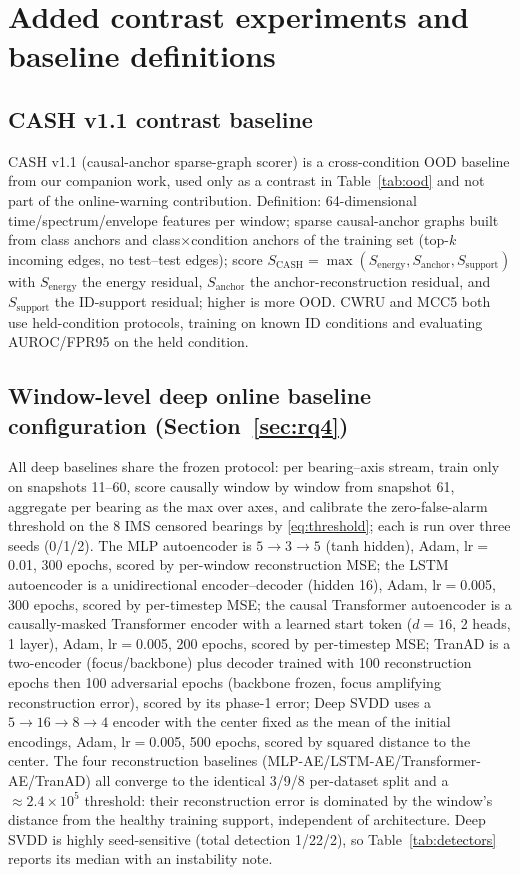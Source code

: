 \documentclass[journal]{IEEEtran}
\begin{document}
\section{Added contrast experiments and baseline definitions}\label{app:baselines}
\subsection*{CASH v1.1 contrast baseline}
CASH v1.1 (causal-anchor sparse-graph scorer) is a cross-condition OOD baseline from our companion work, used only as a contrast in Table~\ref{tab:ood} and not part of the online-warning contribution. Definition: 64-dimensional time/spectrum/envelope features per window; sparse causal-anchor graphs built from class anchors and class$\times$condition anchors of the training set (top-$k$ incoming edges, no test--test edges); score $S_{\mathrm{CASH}}=\max(S_{\mathrm{energy}},S_{\mathrm{anchor}},S_{\mathrm{support}})$ with $S_{\mathrm{energy}}$ the energy residual, $S_{\mathrm{anchor}}$ the anchor-reconstruction residual, and $S_{\mathrm{support}}$ the ID-support residual; higher is more OOD. CWRU and MCC5 both use held-condition protocols, training on known ID conditions and evaluating AUROC/FPR95 on the held condition.

\subsection*{Window-level deep online baseline configuration (Section~\ref{sec:rq4})}
All deep baselines share the frozen protocol: per bearing--axis stream, train only on snapshots 11--60, score causally window by window from snapshot 61, aggregate per bearing as the max over axes, and calibrate the zero-false-alarm threshold on the 8 IMS censored bearings by \eqref{eq:threshold}; each is run over three seeds (0/1/2). The MLP autoencoder is $5\to3\to5$ (tanh hidden), Adam, lr$=$0.01, 300 epochs, scored by per-window reconstruction MSE; the LSTM autoencoder is a unidirectional encoder--decoder (hidden 16), Adam, lr$=$0.005, 300 epochs, scored by per-timestep MSE; the causal Transformer autoencoder is a causally-masked Transformer encoder with a learned start token ($d{=}16$, 2 heads, 1 layer), Adam, lr$=$0.005, 200 epochs, scored by per-timestep MSE; TranAD is a two-encoder (focus/backbone) plus decoder trained with 100 reconstruction epochs then 100 adversarial epochs (backbone frozen, focus amplifying reconstruction error), scored by its phase-1 error; Deep SVDD uses a $5\to16\to8\to4$ encoder with the center fixed as the mean of the initial encodings, Adam, lr$=$0.005, 500 epochs, scored by squared distance to the center. The four reconstruction baselines (MLP-AE/LSTM-AE/Transformer-AE/TranAD) all converge to the identical 3/9/8 per-dataset split and a $\approx2.4\times10^{5}$ threshold: their reconstruction error is dominated by the window's distance from the healthy training support, independent of architecture. Deep SVDD is highly seed-sensitive (total detection 1/22/2), so Table~\ref{tab:detectors} reports its median with an instability note.
\end{document}
